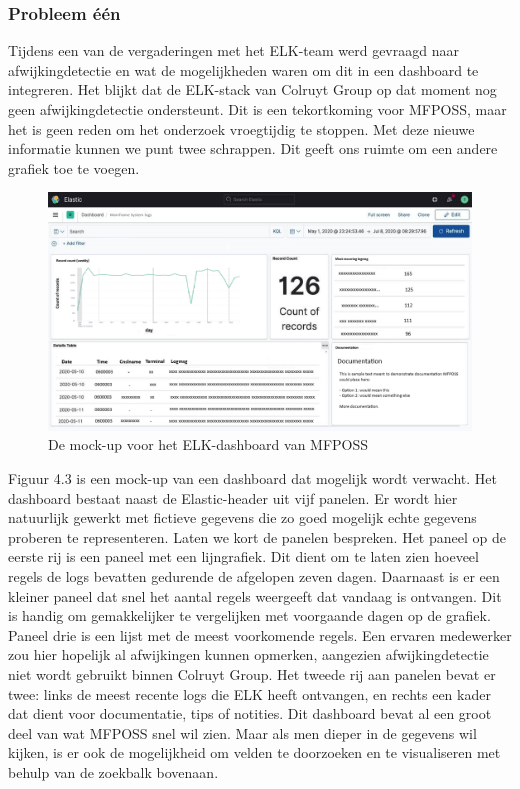 \subsubsection{Probleem één}
Tijdens een van de vergaderingen met het ELK-team werd gevraagd naar afwijkingdetectie en wat de mogelijkheden waren om dit in een dashboard te integreren. Het blijkt dat de ELK-stack van Colruyt Group op dat moment nog geen afwijkingdetectie ondersteunt. Dit is een tekortkoming voor MFPOSS, maar het is geen reden om het onderzoek vroegtijdig te stoppen. Met deze nieuwe informatie kunnen we punt twee schrappen. Dit geeft ons ruimte om een andere grafiek toe te voegen.

\begin{figure}[h]
    \centering
    \includegraphics[width=1\linewidth]{bachproef//graphics/Dashboard_mockup.png}
    \caption{De mock-up voor het ELK-dashboard van MFPOSS}
    \label{fig: De mock-up voor het ELK-dashboard van MFPOSS}
\end{figure}

Figuur 4.3 is een mock-up van een dashboard dat mogelijk wordt verwacht. Het dashboard bestaat naast de Elastic-header uit vijf panelen. Er wordt hier natuurlijk gewerkt met fictieve gegevens die zo goed mogelijk echte gegevens proberen te representeren. Laten we kort de panelen bespreken. Het paneel op de eerste rij is een paneel met een lijngrafiek. Dit dient om te laten zien hoeveel regels de logs bevatten gedurende de afgelopen zeven dagen. Daarnaast is er een kleiner paneel dat snel het aantal regels weergeeft dat vandaag is ontvangen. Dit is handig om gemakkelijker te vergelijken met voorgaande dagen op de grafiek. Paneel drie is een lijst met de meest voorkomende regels. Een ervaren medewerker zou hier hopelijk al afwijkingen kunnen opmerken, aangezien afwijkingdetectie niet wordt gebruikt binnen Colruyt Group. Het tweede rij aan panelen bevat er twee: links de meest recente logs die ELK heeft ontvangen, en rechts een kader dat dient voor documentatie, tips of notities. Dit dashboard bevat al een groot deel van wat MFPOSS snel wil zien. Maar als men dieper in de gegevens wil kijken, is er ook de mogelijkheid om velden te doorzoeken en te visualiseren met behulp van de zoekbalk bovenaan.

